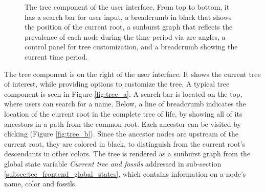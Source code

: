\documentclass[11pt, a4paper,oneside,chapterprefix=false]{scrbook}
\begin{document}
\begin{figure}[h]
	\caption{The tree component of the user interface. From top to bottom, it has a search bar for user input, a breadcrumb in black that shows the position of the current root, a sunburst graph that reflects the prevalence of each node during the time period via arc angles, a control panel for tree customization, and a breadcrumb showing the current time period.}
	\label{fig:tree}
\end{figure}
The tree component is on the right of the user interface. It shows the current tree of interest, while providing options to customize the tree. A typical tree component is seen in Figure \ref{fig:tree_a}. A search bar is located on the top, where users can search for a name. Below, a line of breadcrumb indicates the location of the current root in the complete tree of life, by showing all of its ancestors in a path from the common root. Each ancestor can be visited by clicking (Figure \ref{fig:tree_b}). Since the ancestor nodes are upstream of the current root, they are colored in black, to distinguish from the current root's descendants in other colors. The tree is rendered as a sunburst graph from the global state variable \emph{Current tree and fossils} addressed in sub-section \ref{subsec:tec_frontend_global_states}, which contains information on a node's name, color and fossils. \\
\end{document}
